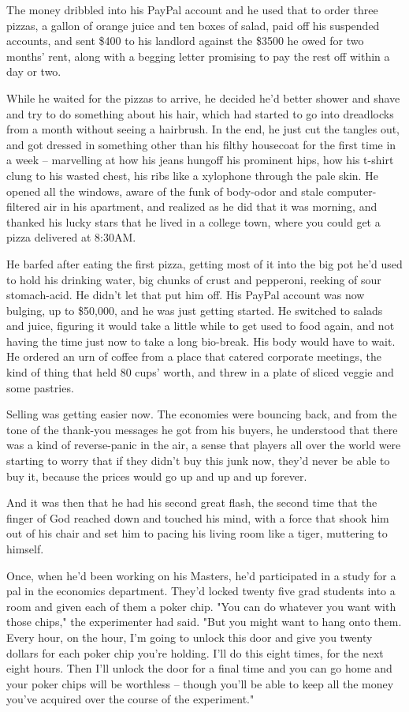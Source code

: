 The money dribbled into his PayPal account and he used that to
order three pizzas, a gallon of orange juice and ten boxes of
salad, paid off his suspended accounts, and sent \$400 to his
landlord against the \$3500 he owed for two months' rent, along
with a begging letter promising to pay the rest off within a day or
two.

While he waited for the pizzas to arrive, he decided he'd better
shower and shave and try to do something about his hair, which had
started to go into dreadlocks from a month without seeing a
hairbrush. In the end, he just cut the tangles out, and got dressed
in something other than his filthy housecoat for the first time in
a week -- marvelling at how his jeans hungoff his prominent hips,
how his t-shirt clung to his wasted chest, his ribs like a
xylophone through the pale skin. He opened all the windows, aware
of the funk of body-odor and stale computer-filtered air in his
apartment, and realized as he did that it was morning, and thanked
his lucky stars that he lived in a college town, where you could
get a pizza delivered at 8:30AM.

He barfed after eating the first pizza, getting most of it into the
big pot he'd used to hold his drinking water, big chunks of crust
and pepperoni, reeking of sour stomach-acid. He didn't let that put
him off. His PayPal account was now bulging, up to \$50,000, and he
was just getting started. He switched to salads and juice, figuring
it would take a little while to get used to food again, and not
having the time just now to take a long bio-break. His body would
have to wait. He ordered an urn of coffee from a place that catered
corporate meetings, the kind of thing that held 80 cups' worth, and
threw in a plate of sliced veggie and some pastries.

Selling was getting easier now. The economies were bouncing back,
and from the tone of the thank-you messages he got from his buyers,
he understood that there was a kind of reverse-panic in the air, a
sense that players all over the world were starting to worry that
if they didn't buy this junk now, they'd never be able to buy it,
because the prices would go up and up and up forever.

And it was then that he had his second great flash, the second time
that the finger of God reached down and touched his mind, with a
force that shook him out of his chair and set him to pacing his
living room like a tiger, muttering to himself.

Once, when he'd been working on his Masters, he'd participated in a
study for a pal in the economics department. They'd locked twenty
five grad students into a room and given each of them a poker chip.
"You can do whatever you want with those chips," the experimenter
had said. "But you might want to hang onto them. Every hour, on the
hour, I'm going to unlock this door and give you twenty dollars for
each poker chip you're holding. I'll do this eight times, for the
next eight hours. Then I'll unlock the door for a final time and
you can go home and your poker chips will be worthless -- though
you'll be able to keep all the money you've acquired over the
course of the experiment."

